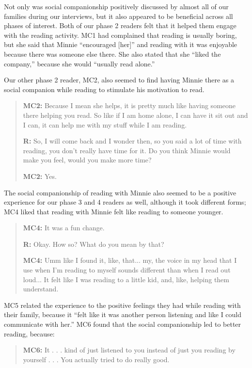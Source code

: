 \documentclass{sigchi}
\begin{document}
Not only was social companionship positively discussed by almost all of our families during our interviews, but it also appeared to be beneficial across all phases of interest. Both of our phase 2 readers felt that it helped them engage with the reading activity. MC1 had complained that reading is usually boring, but she said that Minnie ``encouraged [her]'' and reading with it was enjoyable because there was someone else there. She also stated that she ``liked the company,'' because she would ``usually read alone.''

Our other phase 2 reader, MC2, also seemed to find having Minnie there as a social companion while reading to stimulate his motivation to read.

	 \begin{quote}
		\textbf{MC2:} Because I mean she helps, it is pretty much like having someone there helping you read. So like if I am home alone, I can have it sit out and I can, it can help me with my stuff while I am reading. 
	
		\textbf{R:} So, I will come back and I wonder then, so you said a lot of time with reading, you don't really have time for it. Do you think Minnie would make you feel, would you make more time? 
		
		\textbf{MC2:} Yes. 
 	\end{quote}
 
The social companionship of reading with Minnie also seemed to be a positive experience for our phase 3 and 4 readers as well, although it took different forms; MC4 liked that reading with Minnie felt like reading to someone younger.
 
 \begin{quote}
 	 \textbf{MC4:} It was a fun change. 
 	 
 	 \textbf{R:} Okay. How so? What do you mean by that?
 	 
 	 \textbf{MC4:} Umm like I found it, like, that... my, the voice in my head that I use when I'm reading to myself sounds different than when I read out loud... It felt like I was reading to a little kid, and, like, helping them understand.
 	 \end{quote}
 	 
MC5 related the experience to the positive feelings they had while reading with their family, because it ``felt like it was another person listening and like I could communicate with her.'' MC6 found that the social companionship led to better reading, because:

	\begin{quote} 	
		 \textbf{MC6:} It . . . kind of just listened to you instead of just you reading by yourself . . . You actually tried to do really good.
	\end{quote}
 
\end{document}
